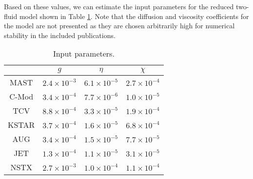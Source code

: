 Based on these values, we can estimate the input parameters for the reduced two-fluid model shown in Table \ref{tab:input}. Note that the diffusion and viscosity coefficients for the model are not presented as they are chosen arbitrarily high for numerical stability in the included publications.
\begin{table}[h!]
	\begin{center}
		\caption{Input parameters.}
		\label{tab:input}
		\begin{tabular}{c|c c c } 
			&  $g$ & $\eta$ & $\chi$ \\
			\hline
			MAST & $2.4\times 10^{-3}$ &  $6.1\times 10^{-5}$ & $2.7 \times 10^{-4}$\\
			C-Mod& $3.4\times 10^{-4}$ &  $7.7\times 10^{-6}$ & $1.0 \times 10^{-5}$\\
			TCV & $8.8\times 10^{-4}$ &  $3.3\times 10^{-5}$ & $1.9 \times 10^{-4}$ \\
			KSTAR & $3.7\times 10^{-4}$ & $1.6\times 10^{-5}$ & $6.8 \times 10^{-4}$ \\
			AUG & $3.4\times 10^{-4}$ & $1.5\times 10^{-5}$ & $7.7 \times 10^{-5}$ \\
			JET & $1.3\times 10^{-4}$ & $1.1\times 10^{-5}$ & $3.1 \times 10^{-5}$ \\
			NSTX & $2.7\times 10^{-3}$ & $1.0\times 10^{-4}$ & $1.1 \times 10^{-4}$ \\
		\end{tabular}
	\end{center}
\end{table}

